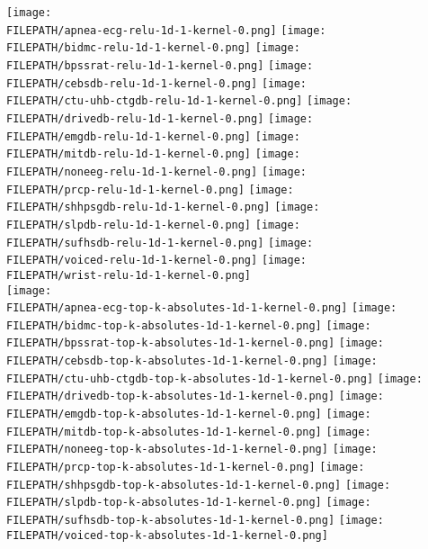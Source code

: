 \documentclass[journal]{IEEEtran}
\providecommand{\FILEPATH}{~/github.com/pbizopoulos/sparsely-activated-networks/packages/python/tmp}
\begin{document}
\begin{figure*}[!t]
  \centering
  \texttt{[image: \\FILEPATH/apnea-ecg-relu-1d-1-kernel-0.png]}
  \texttt{[image: \\FILEPATH/bidmc-relu-1d-1-kernel-0.png]}
  \texttt{[image: \\FILEPATH/bpssrat-relu-1d-1-kernel-0.png]}
  \texttt{[image: \\FILEPATH/cebsdb-relu-1d-1-kernel-0.png]}
  \texttt{[image: \\FILEPATH/ctu-uhb-ctgdb-relu-1d-1-kernel-0.png]}
  \texttt{[image: \\FILEPATH/drivedb-relu-1d-1-kernel-0.png]}
  \texttt{[image: \\FILEPATH/emgdb-relu-1d-1-kernel-0.png]}
  \texttt{[image: \\FILEPATH/mitdb-relu-1d-1-kernel-0.png]}
  \texttt{[image: \\FILEPATH/noneeg-relu-1d-1-kernel-0.png]}
  \texttt{[image: \\FILEPATH/prcp-relu-1d-1-kernel-0.png]}
  \texttt{[image: \\FILEPATH/shhpsgdb-relu-1d-1-kernel-0.png]}
  \texttt{[image: \\FILEPATH/slpdb-relu-1d-1-kernel-0.png]}
  \texttt{[image: \\FILEPATH/sufhsdb-relu-1d-1-kernel-0.png]}
  \texttt{[image: \\FILEPATH/voiced-relu-1d-1-kernel-0.png]}
  \texttt{[image: \\FILEPATH/wrist-relu-1d-1-kernel-0.png]}
  \\
  \texttt{[image: \\FILEPATH/apnea-ecg-top-k-absolutes-1d-1-kernel-0.png]}
  \texttt{[image: \\FILEPATH/bidmc-top-k-absolutes-1d-1-kernel-0.png]}
  \texttt{[image: \\FILEPATH/bpssrat-top-k-absolutes-1d-1-kernel-0.png]}
  \texttt{[image: \\FILEPATH/cebsdb-top-k-absolutes-1d-1-kernel-0.png]}
  \texttt{[image: \\FILEPATH/ctu-uhb-ctgdb-top-k-absolutes-1d-1-kernel-0.png]}
  \texttt{[image: \\FILEPATH/drivedb-top-k-absolutes-1d-1-kernel-0.png]}
  \texttt{[image: \\FILEPATH/emgdb-top-k-absolutes-1d-1-kernel-0.png]}
  \texttt{[image: \\FILEPATH/mitdb-top-k-absolutes-1d-1-kernel-0.png]}
  \texttt{[image: \\FILEPATH/noneeg-top-k-absolutes-1d-1-kernel-0.png]}
  \texttt{[image: \\FILEPATH/prcp-top-k-absolutes-1d-1-kernel-0.png]}
  \texttt{[image: \\FILEPATH/shhpsgdb-top-k-absolutes-1d-1-kernel-0.png]}
  \texttt{[image: \\FILEPATH/slpdb-top-k-absolutes-1d-1-kernel-0.png]}
  \texttt{[image: \\FILEPATH/sufhsdb-top-k-absolutes-1d-1-kernel-0.png]}
  \texttt{[image: \\FILEPATH/voiced-top-k-absolutes-1d-1-kernel-0.png]}

\end{figure*}
\end{document}
